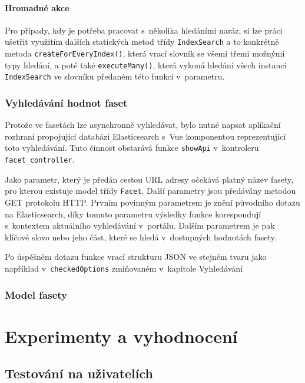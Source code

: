 \subsubsection*{Hromadné akce}
Pro případy, kdy je potřeba pracovat s~několika hledáními naráz, si lze práci ušetřit využitím dalších statických metod třídy \texttt{IndexSearch} a to konkrétně metoda \texttt{createForEveryIndex()}, která vrací slovník se všemi třemi možnými typy hledání, a poté také \texttt{executeMany()}, která vykoná hledání všech instancí \texttt{IndexSearch} ve slovníku předaném této funkci v~parametru. 

\subsection{Vyhledávání hodnot faset}
Protože ve fasetách lze asynchronně vyhledávat, bylo nutné napsat aplikační rozhraní propojující databázi Elasticsearch s~Vue komponentou reprezentující toto vyhledávání. Tuto činnost obstarává funkce \texttt{showApi} v~kontroleru \texttt{facet\_controller}.

Jako parametr, který je předán cestou URL adresy očekává platný název fasety, pro kterou existuje model třídy \texttt{Facet}. Další parametry jsou předávány metodou GET protokolu HTTP. Prvním povinným parametrem je znění původního dotazu na Elasticsearch, díky tomuto parametru výsledky funkce korespondují s~kontextem aktuálního vyhledávání v~portálu. Dalším parametrem je pak klíčové slovo nebo jeho část, které se hledá v~dostupných hodnotách fasety. 

Po úspěšném dotazu funkce vrací strukturu JSON ve stejném tvaru jako například v~\texttt{checkedOptions} zmiňovaném v~kapitole Vyhledávání %

\subsection{Model fasety}
\blindtext[2]



\chapter{Experimenty a vyhodnocení}
\blindtext

\section{Testování na uživatelích}
\blindtext[2]

